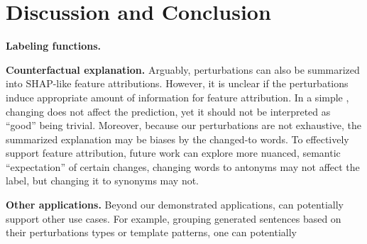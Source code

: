 \section{Discussion and Conclusion}
\label{sec:discuss} 

\textbf{Labeling functions.}

\textbf{Counterfactual explanation.}
Arguably, perturbations can also be summarized into SHAP-like feature attributions.
However, it is unclear if the perturbations induce appropriate amount of information for feature attribution.
In a simple , changing  does not affect the prediction, yet it should not be interpreted as ``good'' being trivial.
Moreover, because our perturbations are not exhaustive, the summarized explanation may be biases by the changed-to words.
To effectively support feature attribution, future work can explore more nuanced, semantic ``expectation'' of certain changes, \ie changing words to antonyms may not affect the label, but changing it to synonyms may not.

\textbf{Other applications.}
Beyond our demonstrated applications, \sysname can potentially support other use cases. 
For example, grouping generated sentences based on their perturbations types or template patterns, one can potentially 
